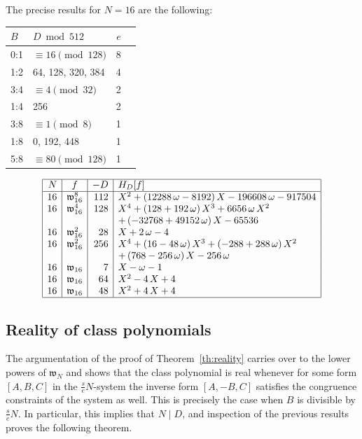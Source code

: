 \documentclass[12pt,twoside,leqno]{article}
\numberwithin{equation}{section}
\newcommand{\w}{\mathfrak w}
\begin{document}
The precise results for $N = 16$ are the following:

\begin{center}
\begin{tabular}{|l|l|r|l|}\hline
$B$ & $D\bmod 512$ & $e$ \\\hline
0:1& $\equiv 16 \pmod {128}$ & 8 \\
1:2& 64, 128, 320, 384 & 4 \\
3:4& $\equiv 4 \pmod {32}$ & 2 \\
1:4& 256 & 2 \\
3:8& $\equiv 1\pmod 8$ & 1 \\
1:8& 0, 192, 448 & 1 \\
5:8& $\equiv 80 \pmod {128}$ & 1 \\
\hline
\end{tabular}
\end{center}

$$\begin{array}{|r|c|r|l|}\hline
N & f & -D & H_{D}[f] \\ \hline
16 & \w_{16}^{8} & 112 &
{X}^{2}+ \left( 12288\,\omega-8192 \right) X-196608\,\omega-917504
\\
16 & \w_{16}^{4} & 128 &
{X}^{4}+ \left( 128+192\,\omega \right)
{X}^{3}+6656\,\omega\,{X}^{2}\\
&&&+ \left( -32768+49152\,\omega \right) X-65536
\\
16 & \w_{16}^{2} & 28 &
X+2\,\omega-4
\\
16 & \w_{16}^{2} & 256 &
{X}^{4}+ \left( 16-48\,\omega \right) {X}^{3}+ \left( -288+288\,\omega
 \right) {X}^{2}\\
&&&+ \left( 768-256\,\omega \right) X-256\,\omega
\\
16 & \w_{16} & 7 &
X-\omega-1
\\
16 & \w_{16} & 64 &
{X}^{2}-4\,X+4
\\
16 & \w_{16} & 48 &
{X}^{2}+4\,X+4
\\
\hline
\end{array}$$

\subsection {Reality of class polynomials}

The argumentation of the proof of Theorem~\ref {th:reality} carries over to the
lower powers of $\w_N$ and shows that the class polynomial is real
whenever for some form $[A, B, C]$ in the $\frac {s}{e} N$-system the inverse
form $[A, -B, C]$ satisfies the congruence constraints of the system as well.
This is precisely the case when $B$ is divisible by $\frac
{s}{e}N$. In particular, this implies that $N \mid D$, and inspection
of the previous results proves the following theorem.
\end{document}
